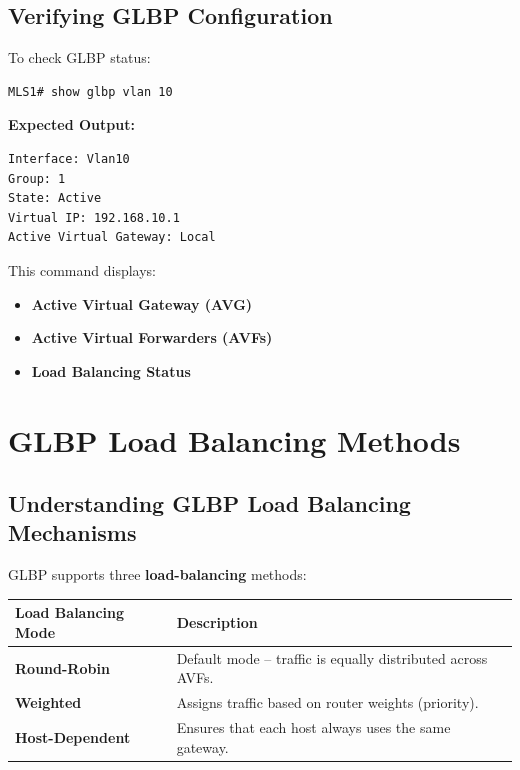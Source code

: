\documentclass[a4paper]{book}
\begin{document}
\subsection{Verifying GLBP Configuration}
To check GLBP status:
\begin{lstlisting}
MLS1# show glbp vlan 10
\end{lstlisting}

\textbf{Expected Output:}
\begin{lstlisting}
Interface: Vlan10
Group: 1
State: Active
Virtual IP: 192.168.10.1
Active Virtual Gateway: Local
\end{lstlisting}

This command displays:
\begin{itemize}
\item \textbf{Active Virtual Gateway (AVG)}
\item \textbf{Active Virtual Forwarders (AVFs)}
\item \textbf{Load Balancing Status}
\end{itemize}


\vspace{1em}

\section{GLBP Load Balancing Methods}

\subsection{Understanding GLBP Load Balancing Mechanisms}
GLBP supports three \textbf{load-balancing} methods:

\begin{center}
\begin{tabular}{|l|p{8cm}|}
\hline
\textbf{Load Balancing Mode} & \textbf{Description} \\ \hline
\textbf{Round-Robin} & Default mode -- traffic is equally distributed across AVFs. \\ \hline
\textbf{Weighted} & Assigns traffic based on router weights (priority). \\ \hline
\textbf{Host-Dependent} & Ensures that each host always uses the same gateway. \\ \hline
\end{tabular}
\end{center}
\end{document}
